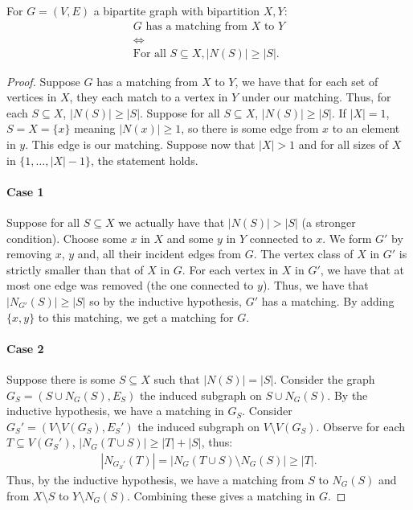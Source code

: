 For $G = (V, E)$ a bipartite graph with bipartition $X, Y$: \begin{gather*}
  G \text{ has a matching from } X \text{ to } Y \\
  \Longleftrightarrow \\
  \text{For all } S \subseteq X, |N(S)| \geq |S|.
\end{gather*}
\begin{proof}
    Suppose $G$ has a matching from $X$ to $Y$, we have that
    for each set of vertices in $X$, they each match to a
    vertex in $Y$ under our matching. Thus, for each $S \subseteq X$,
    $|N(S)| \geq |S|$. Suppose for all $S \subseteq X$, 
    $|N(S)| \geq |S|$. If $|X| = 1$, $S = X = \{x\}$ meaning
    $|N(x)| \geq 1$, so there is some edge from $x$ to an
    element in $y$. This edge is our matching.
    Suppose now that $|X| > 1$ and for all sizes of $X$ in
    $\{1, \ldots, |X| - 1\}$, the statement holds.
    \paragraph{Case 1}
    Suppose for all $S \subseteq X$ we actually have that 
    $|N(S)| > |S|$ (a stronger condition). Choose some
    $x$ in $X$ and some $y$ in $Y$ connected to $x$. We
    form $G'$ by removing $x$, $y$ and, all their incident
    edges from $G$. The vertex class of $X$ in $G'$
    is strictly smaller than that of $X$ in $G$. For
    each vertex in $X$ in $G'$, we have that at most
    one edge was removed (the one connected to $y$).
    Thus, we have that $|N_{G'}(S)| \geq |S|$ so by the
    inductive hypothesis, $G'$ has a matching. By adding
    $\{x, y\}$ to this matching, we get a matching for $G$.
    \paragraph{Case 2}
    Suppose there is some $S \subseteq X$ such that $|N(S)| = |S|$.
    Consider the graph $G_S = (S \cup N_G(S), E_S)$ the induced
    subgraph on $S \cup N_G(S)$. By the inductive hypothesis,
    we have a matching in $G_S$. Consider 
    $G_S' = (V \setminus V(G_S), E_S')$ the induced subgraph on
    $V \setminus V(G_S)$. Observe for each $T \subseteq V(G_S')$,
    $|N_G(T \cup S)| \geq |T| + |S|$, thus: \begin{gather*}
        |N_{G_S'}(T)| = |N_G(T \cup S) \setminus N_G(S)| \geq |T|.
    \end{gather*} Thus, by the inductive hypothesis, we have a matching
    from $S$ to $N_G(S)$ and from $X \setminus S$ to $Y \setminus N_G(S)$.
    Combining these gives a matching in $G$. 
\end{proof}

